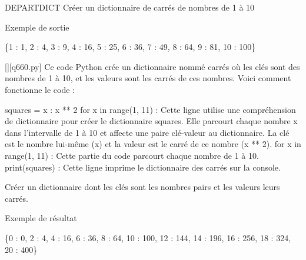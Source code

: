         \question
        DEPARTDICT
Créer un dictionnaire de carrés de nombres de 1 à 10

Exemple de sortie

\{1 : 1, 2 : 4, 3 : 9, 4 : 16, 5 : 25, 6 : 36, 7 : 49, 8 : 64, 9 : 81, 10 : 100\}
        \par
        \begin{solution}
            \renewcommand{\nomfichier}{q660.py}
            \pythonfile{\chemincode \nomfichier}[][\nomfichier]
            Ce code Python crée un dictionnaire nommé carrés où les clés sont des nombres de 1 à 10, et les valeurs sont les carrés de ces nombres. Voici comment fonctionne le code :

    squares = {x : x ** 2 for x in range(1, 11)} : Cette ligne utilise une compréhension de dictionnaire pour créer le dictionnaire squares. Elle parcourt chaque nombre x dans l'intervalle de 1 à 10 et affecte une paire clé-valeur au dictionnaire. La clé est le nombre lui-même (x) et la valeur est le carré de ce nombre (x ** 2).
        for x in range(1, 11) : Cette partie du code parcourt chaque nombre de 1 à 10.
    print(squares) : Cette ligne imprime le dictionnaire des carrés sur la console.
        \end{solution}
        

        \question
        Créer un dictionnaire dont les clés sont les nombres pairs et les valeurs leurs carrés.

Exemple de résultat

\{0 : 0, 2 : 4, 4 : 16, 6 : 36, 8 : 64, 10 : 100, 12 : 144, 14 : 196, 16 : 256, 18 : 324, 20 : 400\}
        \par
        

